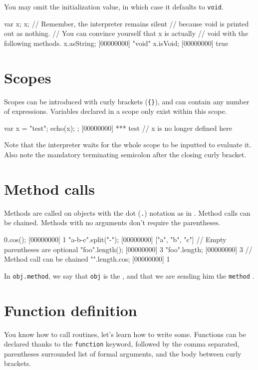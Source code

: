 You may omit the initialization value, in which case it defaults to
\lstinline|void|.

\begin{urbiscript}
var x;
x;
// Remember, the interpreter remains silent
// because void is printed out as nothing.
// You can convince yourself that x is actually
// void with the following methods.
x.asString;
[00000000] "void"
x.isVoid;
[00000000] true
\end{urbiscript}

\section{Scopes}
Scopes can be introduced with curly brackets (\lstinline|{}|), and can
contain any number of expressions. Variables declared in a scope only
exist within this scope.

\begin{urbiscript}
{
  var x = "test";
  echo(x);
};
[00000000] *** test
// x is no longer defined here
\end{urbiscript}

Note that the interpreter waits for the whole scope to be inputted to
evaluate it. Also note the mandatory terminating semicolon after the
closing curly bracket.

\section{Method calls}

Methods are called on objects with the dot (\lstinline{.}) notation as in
\Cxx. Method calls can be chained. Methods with no arguments don't
require the parentheses.

\begin{urbiscript}
0.cos();
[00000000] 1
"a-b-c".split("-");
[00000000] ["a", "b", "c"]
// Empty parentheses are optional
"foo".length();
[00000000] 3
"foo".length;
[00000000] 3
// Method call can be chained
"".length.cos;
[00000000] 1
\end{urbiscript}

In \lstinline|obj.method|, we say that \lstinline{obj} is the
, and that we are sending him the \lstinline{method}
.

\section{Function definition}

You know how to call routines, let's learn how to write
some. Functions can be declared thanks to the \lstinline{function}
keyword, followed by the comma separated, parentheses surrounded list
of formal arguments, and the body between curly brackets.

